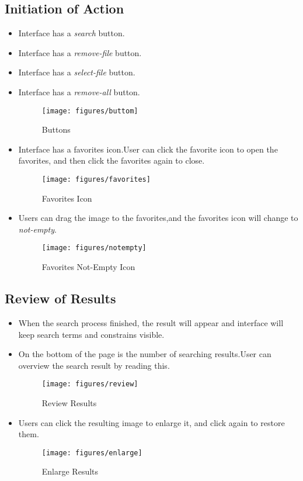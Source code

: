 \documentclass{hci}
\begin{document}
\subsection{Initiation of Action}
\begin{itemize}
	\item Interface has a \textit{search} button.
	\item Interface has a \textit{remove-file} button.
	\item Interface has a \textit{select-file} button.
	\item Interface has a \textit{remove-all} button.
	\begin{figure}[htbp]
		\centering
		\texttt{[image: figures/buttom]}
		\caption{Buttons}
		\label{fig:buttons}
	\end{figure}
	\item Interface has a favorites icon.User can click the favorite icon to open the favorites, and then click the favorites again to close.
	\begin{figure}[htbp]
		\centering
		\texttt{[image: figures/favorites]}
		\caption{Favorites Icon}
		\label{fig:favorites}
	\end{figure}
	\item Users can drag the image to the favorites,and the favorites icon will change to \textit{not-empty}.
	\begin{figure}[htbp]
		\centering
		\texttt{[image: figures/notempty]}
		\caption{Favorites Not-Empty Icon}
		\label{fig:notempty}
	\end{figure}
\end{itemize}
\subsection{Review of Results}
\begin{itemize}
	\item When the search process finished, the result will appear and interface will keep search terms and constrains visible.
	\item On the bottom of the page is the number of searching results.User can overview the search result by reading this.
	\begin{figure}[htbp]
		\centering
		\texttt{[image: figures/review]}
		\caption{Review Results}
		\label{fig:review}
	\end{figure}
	\item Users can click the resulting image to enlarge it, and click again to restore them.
	\begin{figure}[htbp]
		\centering
		\texttt{[image: figures/enlarge]}
		\caption{Enlarge Results}
		\label{fig:enlarge}
	\end{figure}
	
\end{itemize}
\end{document}
